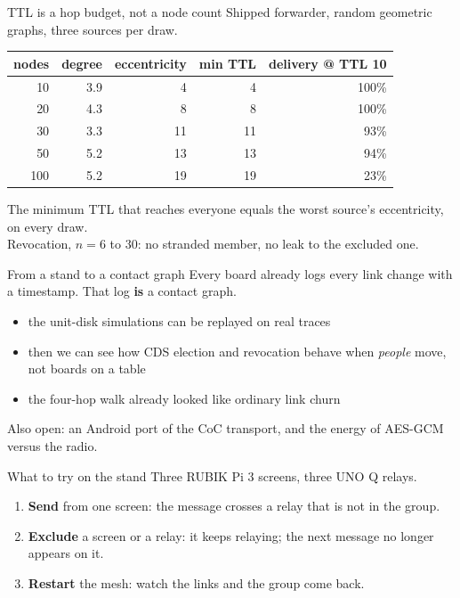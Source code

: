 \documentclass[aspectratio=169,11pt]{beamer}
\begin{document}
\begin{frame}{TTL is a hop budget, not a node count}
Shipped forwarder, random geometric graphs, three sources per draw.
\vspace{3mm}
\centering
{\small
\begin{tabular}{@{}rrrrr@{}}
\toprule
nodes & degree & eccentricity & min TTL & delivery @ TTL 10 \\
\midrule
10 & 3.9 & 4 & 4 & 100\% \\
20 & 4.3 & 8 & 8 & 100\% \\
30 & 3.3 & 11 & 11 & 93\% \\
50 & 5.2 & 13 & 13 & 94\% \\
100 & 5.2 & 19 & 19 & 23\% \\
\bottomrule
\end{tabular}}
\vspace{5mm}
The minimum TTL that reaches everyone equals the worst source's
eccentricity, on every draw.\\
Revocation, $n=6$ to $30$: no stranded member, no leak to the excluded one.
\end{frame}

\begin{frame}{From a stand to a contact graph}
Every board already logs every link change with a timestamp.
\vspace{5mm}
That log \textbf{is} a contact graph.
\vspace{4mm}
\begin{itemize}
  \item the unit-disk simulations can be replayed on real traces
  \item then we can see how CDS election and revocation behave when
        \emph{people} move, not boards on a table
  \item the four-hop walk already looked like ordinary link churn
\end{itemize}
\vspace{5mm}
{\color{muted}\small Also open: an Android port of the CoC transport, and the
energy of AES-GCM versus the radio.}
\end{frame}

\begin{frame}{What to try on the stand}
Three RUBIK Pi 3 screens, three UNO Q relays.
\vspace{5mm}
\begin{enumerate}
  \item \textbf{Send} from one screen: the message crosses a relay that
        is not in the group.
  \item \textbf{Exclude} a screen or a relay: it keeps relaying; the next
        message no longer appears on it.
  \item \textbf{Restart} the mesh: watch the links and the group come back.
\end{enumerate}
\end{frame}
\end{document}
